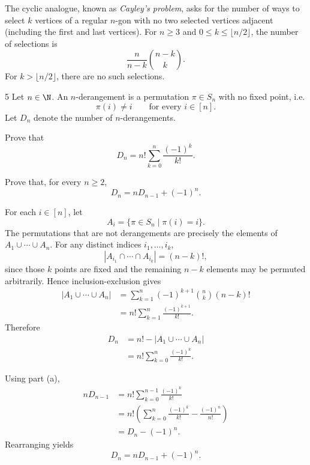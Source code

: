 \documentclass[11pt,oneside]{article}
\begin{document}
\begin{remark}
The cyclic analogue, known as \emph{Cayley's problem}, asks for the number of ways to select $k$ vertices of a regular $n$-gon with no two selected vertices adjacent (including the first and last vertices). For $n\geq3$ and $0\leq k\leq\lfloor n/2\rfloor$, the number of selections is
\[
    \frac{n}{n-k}\binom{n-k}{k}.
\]
For $k>\lfloor n/2\rfloor$, there are no such selections.
\end{remark}

\begin{problem}{5}
Let $n\in\N$. An $n$-derangement is a permutation $\pi\in S_n$ with no fixed point, i.e.
\[
    \pi(i)\neq i
    \qquad\text{for every }i\in[n].
\]
Let $D_n$ denote the number of $n$-derangements.
\begin{problemsubparts}
    \item Prove that
    \[
        D_n=n!\sum_{k=0}^{n}\frac{(-1)^k}{k!}.
    \]

    \item Prove that, for every $n\geq2$,
    \[
        D_n=nD_{n-1}+(-1)^n.
    \]
\end{problemsubparts}
\end{problem}

\begin{solution}
\begin{problemsubparts}
    \item For each $i\in[n]$, let
    \[
        A_i=\{\pi\in S_n\mid \pi(i)=i\}.
    \]
    The permutations that are not derangements are precisely the elements of $A_1\cup\cdots\cup A_n$. For any distinct indices $i_1,\ldots,i_k$,
    \[
        |A_{i_1}\cap\cdots\cap A_{i_k}|=(n-k)!,
    \]
    since those $k$ points are fixed and the remaining $n-k$ elements may be permuted arbitrarily. Hence inclusion-exclusion gives
    \[
    \begin{aligned}
        |A_1\cup\cdots\cup A_n|
        &=\sum_{k=1}^{n}(-1)^{k+1}\binom{n}{k}(n-k)!\\
        &=n!\sum_{k=1}^{n}\frac{(-1)^{k+1}}{k!}.
    \end{aligned}
    \]
    Therefore
    \[
    \begin{aligned}
        D_n
        &=n!-|A_1\cup\cdots\cup A_n|\\
        &=n!\sum_{k=0}^{n}\frac{(-1)^k}{k!}.
    \end{aligned}
    \]

    \item Using part (a),
    \[
    \begin{aligned}
        nD_{n-1}
        &=n!\sum_{k=0}^{n-1}\frac{(-1)^k}{k!}\\
        &=n!\left(
            \sum_{k=0}^{n}\frac{(-1)^k}{k!}
            -\frac{(-1)^n}{n!}
          \right)\\
        &=D_n-(-1)^n.
    \end{aligned}
    \]
    Rearranging yields
    \[
        D_n=nD_{n-1}+(-1)^n.
    \]
\end{problemsubparts}
\end{solution}
\end{document}

